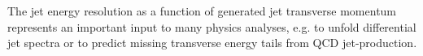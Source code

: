 
The jet energy resolution as a function of generated jet transverse momentum represents an important input to many physics analyses, e.g. to unfold differential jet spectra or to predict missing transverse energy tails from QCD jet-production.
